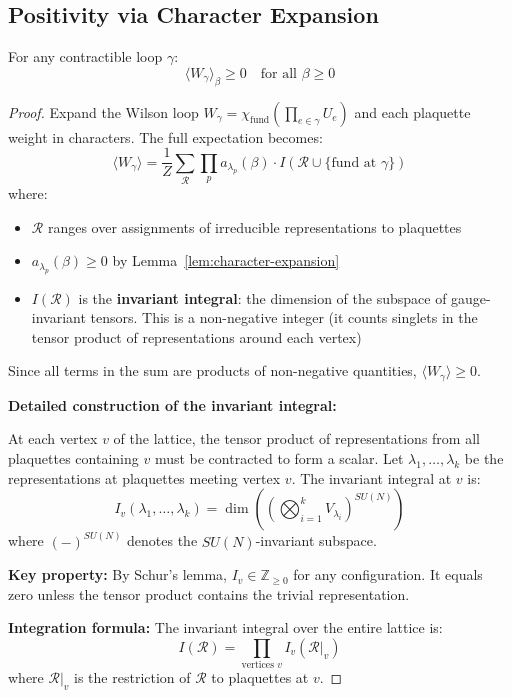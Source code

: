 \subsection{Positivity via Character Expansion}

\begin{theorem}
\label{thm:wilson-positive}
For any contractible loop $\gamma$:
\[
\langle W_\gamma \rangle_\beta \geq 0 \quad \text{for all } \beta \geq 0
\]
\end{theorem}

\begin{proof}
Expand the Wilson loop $W_\gamma = \chi_{\text{fund}}(\prod_{e \in \gamma} U_e)$ 
and each plaquette weight in characters. The full expectation becomes:
\[
\langle W_\gamma \rangle = \frac{1}{Z} \sum_{\mathcal{R}} 
\prod_p a_{\lambda_p}(\beta) \cdot I(\mathcal{R} \cup \{\text{fund at } \gamma\})
\]
where:
\begin{itemize}
\item $\mathcal{R}$ ranges over assignments of irreducible representations to plaquettes
\item $a_{\lambda_p}(\beta) \geq 0$ by Lemma~\ref{lem:character-expansion}
\item $I(\mathcal{R})$ is the \textbf{invariant integral}: the dimension of the 
subspace of gauge-invariant tensors. This is a non-negative integer (it counts 
singlets in the tensor product of representations around each vertex)
\end{itemize}
Since all terms in the sum are products of non-negative quantities, 
$\langle W_\gamma \rangle \geq 0$.

\textbf{Detailed construction of the invariant integral:}

At each vertex $v$ of the lattice, the tensor product of representations 
from all plaquettes containing $v$ must be contracted to form a scalar.
Let $\lambda_1, \ldots, \lambda_k$ be the representations at plaquettes 
meeting vertex $v$. The invariant integral at $v$ is:
\[
I_v(\lambda_1, \ldots, \lambda_k) = \dim\left(\left(\bigotimes_{i=1}^k V_{\lambda_i}\right)^{SU(N)}\right)
\]
where $(-)^{SU(N)}$ denotes the $SU(N)$-invariant subspace.

\textbf{Key property:} By Schur's lemma, $I_v \in \mathbb{Z}_{\geq 0}$ for any 
configuration. It equals zero unless the tensor product contains the trivial 
representation.

\textbf{Integration formula:} The invariant integral over the entire lattice is:
\[
I(\mathcal{R}) = \prod_{\text{vertices } v} I_v(\mathcal{R}|_v)
\]
where $\mathcal{R}|_v$ is the restriction of $\mathcal{R}$ to plaquettes at $v$.


\end{proof}
